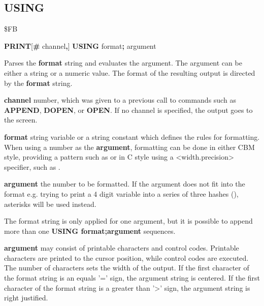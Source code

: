 \subsection{USING}
\begin{description}[leftmargin=2cm,style=nextline]
\item [Token:] \$FB
\item [Format:] {\bf PRINT}[{\bf\#} channel{\bf,}] {\bf USING} format{\bf;} argument
\item [Usage:]  Parses the {\bf format} string and evaluates the argument.
                The argument can be either a string or a numeric value.
                The format of the resulting output is directed
                by the {\bf format} string.

                {\bf channel} number, which was given to a previous
                call to commands such as {\bf APPEND}, {\bf DOPEN}, or {\bf OPEN}.
                If no channel is specified, the output goes to the screen.

                {\bf format} string variable or a string constant
                which defines the rules for formatting.
                When using a number as the {\bf argument}, formatting can be done in either
                CBM style, providing a pattern such as  
                or in C style using a <width.precision> specifier, such as .

                {\bf argument} the number to be formatted. If the argument does not fit into the format
                e.g. trying to print a 4 digit variable into a series of three
                hashes (\screentext{\#\#\#}), asterisks will be used instead.

\item [Remarks:] The format string is only applied for one argument,
                 but it is possible to append more than one
                 {\bf USING format;argument} sequences.

                {\bf argument} may consist of printable
                characters and control codes. Printable characters
                are printed to the cursor position, while control
                codes are executed.
                The number of \screentext{\#} characters sets the width of the output.
                If the first character of the format string
                is an equals '=' sign, the argument string is centered.
                If the first character of the format string
                is a greater than '>' sign, the argument string is right justified.


\end{description}
